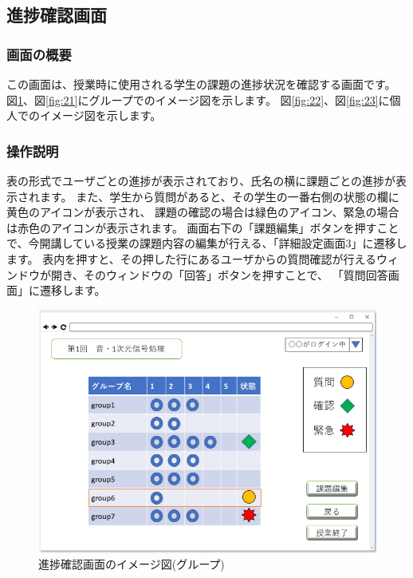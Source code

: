 \subsection{進捗確認画面}
\subsubsection{画面の概要}
この画面は、授業時に使用される学生の課題の進捗状況を確認する画面です。
図\ref{fig:20}、図\ref{fig:21}にグループでのイメージ図を示します。
図\ref{fig:22}、図\ref{fig:23}に個人でのイメージ図を示します。

\subsubsection{操作説明}
表の形式でユーザごとの進捗が表示されており、氏名の横に課題ごとの進捗が表示されます。%
また、学生から質問があると、その学生の一番右側の状態の欄に黄色のアイコンが表示され、
課題の確認の場合は緑色のアイコン、緊急の場合は赤色のアイコンが表示されます。
画面右下の「課題編集」ボタンを押すことで、今開講している授業の課題内容の編集が行える、「詳細設定画面3」に遷移します。
表内を押すと、その押した行にあるユーザからの質問確認が行えるウィンドウが開き、そのウィンドウの「回答」ボタンを押すことで、%
「質問回答画面」に遷移します。


\begin{figure}[phtbp]
  \begin{center}
    \includegraphics[width=1\linewidth,clip]{./img/20.png}
    \caption{進捗確認画面のイメージ図(グループ)}\label{fig:20}
  \end{center}
\end{figure}

